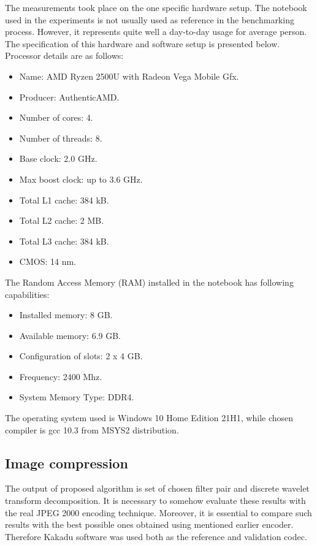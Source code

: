 The measurements took place on the one specific hardware setup. The notebook used in the experiments
is not usually used as reference in the benchmarking process. However, it represents quite well
a day-to-day usage for average person. The specification of this hardware and software setup
is presented below. Processor details are as follows:
\begin{itemize}
    \item Name: AMD Ryzen 2500U with Radeon Vega Mobile Gfx.
    \item Producer: AuthenticAMD.
    \item Number of cores: 4.
    \item Number of threads: 8.
    \item Base clock: 2.0 GHz.
    \item Max boost clock: up to 3.6 GHz.
    \item Total L1 cache: 384 kB.
    \item Total L2 cache: 2 MB.
    \item Total L3 cache: 384 kB.
    \item CMOS: 14 nm.
\end{itemize}
The Random Access Memory (RAM) installed in the notebook has following capabilities:
\begin{itemize}
    \item Installed memory: 8 GB.
    \item Available memory: 6.9 GB.
    \item Configuration of slots: 2 x 4 GB.
    \item Frequency: 2400 Mhz.
    \item System Memory Type: DDR4.
\end{itemize}
The operating system used is Windows 10 Home Edition 21H1, while chosen compiler is gcc 10.3 from MSYS2 distribution.

\subsection{Image compression}

The output of proposed algorithm is set of chosen filter pair and discrete wavelet transform
decomposition. It is necessary to somehow evaluate these results with the real JPEG 2000 encoding
technique. Moreover, it is essential to compare such results with the best possible ones obtained
using mentioned earlier encoder. Therefore Kakadu software was used both as the reference and
validation codec.

